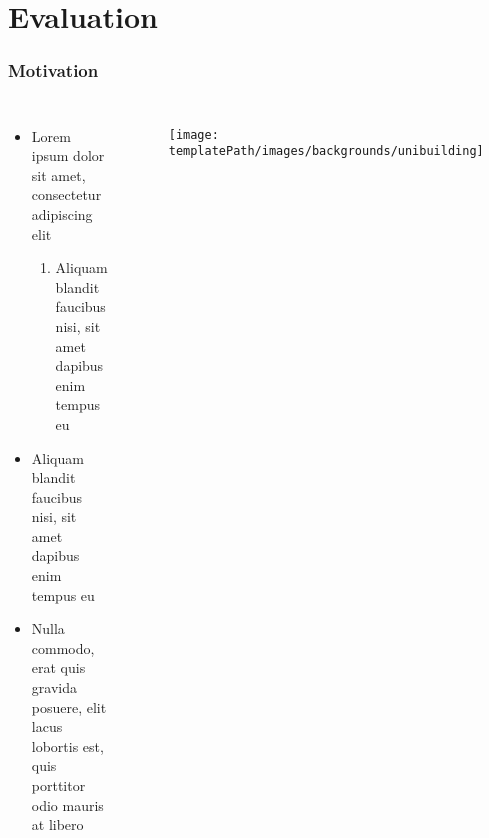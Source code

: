 \section{Evaluation} 

\begin{frame}
	\frametitle{Motivation}
	
	\begin{columns}[c]
		
		
		\begin{itemize}
			\item Lorem ipsum dolor sit amet, consectetur adipiscing elit
			\begin{enumerate}
				\item Aliquam blandit faucibus nisi, sit amet dapibus enim tempus eu
			\end{enumerate}
			\item Aliquam blandit faucibus nisi, sit amet dapibus enim tempus eu
			\item Nulla commodo, erat quis gravida posuere, elit lacus lobortis est, quis porttitor odio mauris at libero
		\end{itemize}
		
		\begin{figure}
			\texttt{[image: \\templatePath/images/backgrounds/unibuilding]}
		\end{figure}
		
		
	\end{columns}
	
\end{frame}